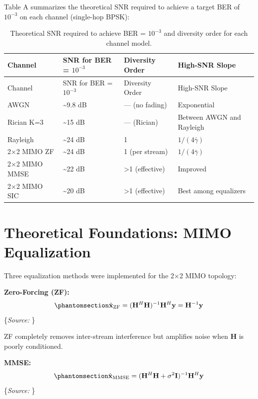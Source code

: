 \documentclass[
  english,
  12pt,
  12pt,
  a4paper,
  oneside]{report}
\begin{document}
Table A summarizes the theoretical SNR required to achieve a target BER of \(10^{-3}\) on each channel (single-hop BPSK):

\begin{longtable}[]{@{}llll@{}}
\caption{Theoretical SNR required to achieve BER = \(10^{-3}\) and diversity order for each channel model.}\label{tbl:table26}\tabularnewline
\toprule\noalign{}
Channel & SNR for BER = \(10^{-3}\) & Diversity Order & High-SNR Slope \\
\midrule\noalign{}
\endfirsthead
\toprule\noalign{}
Channel & SNR for BER = \(10^{-3}\) & Diversity Order & High-SNR Slope \\
\midrule\noalign{}
\endhead
\bottomrule\noalign{}
\endlastfoot
AWGN & \textasciitilde9.8 dB & --- (no fading) & Exponential \\
Rician K=3 & \textasciitilde15 dB & --- (Rician) & Between AWGN and Rayleigh \\
Rayleigh & \textasciitilde24 dB & 1 & \(1/(4\bar{\gamma})\) \\
2×2 MIMO ZF & \textasciitilde24 dB & 1 (per stream) & \(1/(4\bar{\gamma})\) \\
2×2 MIMO MMSE & \textasciitilde22 dB & \textgreater1 (effective) & Improved \\
2×2 MIMO SIC & \textasciitilde20 dB & \textgreater1 (effective) & Best among equalizers \\
\end{longtable}

\section{Theoretical Foundations: MIMO Equalization}\label{sec:theoretical-foundations-mimo-equalization}

Three equalization methods were implemented for the 2×2 MIMO topology:

\textbf{Zero-Forcing (ZF):} \begin{equation}\protect\phantomsection\label{eq:zf-equalizer-methods}{\hat{\mathbf{x}}_{\text{ZF}} = (\mathbf{H}^H\mathbf{H})^{-1}\mathbf{H}^H\mathbf{y} = \mathbf{H}^{-1}\mathbf{y}
}\end{equation} \footnotesize\{\textit{Source: \1}\}\normalsize

ZF completely removes inter-stream interference but amplifies noise when \(\mathbf{H}\) is poorly conditioned.

\textbf{MMSE:} \begin{equation}\protect\phantomsection\label{eq:mmse-equalizer-methods}{\hat{\mathbf{x}}_{\text{MMSE}} = (\mathbf{H}^H\mathbf{H} + \sigma^2\mathbf{I})^{-1}\mathbf{H}^H\mathbf{y}
}\end{equation} \footnotesize\{\textit{Source: \1}\}\normalsize
\end{document}
